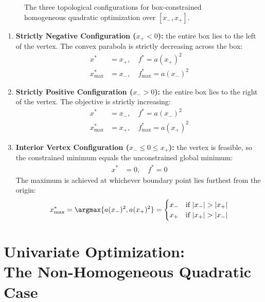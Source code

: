 \begin{figure}[H]
{\begin{tikzpicture}[>=Stealth, font=\small]
\end{tikzpicture}%
}
\caption{The three topological configurations for box-constrained homogeneous quadratic optimization over $[x_-, x_+]$.}
\label{fig:parabola-cases-box-en}
\end{figure}

\begin{enumerate}
    \item \textbf{Strictly Negative Configuration ($x_+ < 0$):} the entire box lies to the left of the vertex. The convex parabola is strictly decreasing across the box:
    \begin{align}
    x^* &= x_+, \quad f^* = a (x_+)^2 \\
    x^*_{\max} &= x_-, \quad f^*_{\max} = a (x_-)^2
    \end{align}
    \item \textbf{Strictly Positive Configuration ($x_- > 0$):} the entire box lies to the right of the vertex. The objective is strictly increasing:
    \begin{align}
    x^* &= x_-, \quad f^* = a (x_-)^2 \\
    x^*_{\max} &= x_+, \quad f^*_{\max} = a (x_+)^2
    \end{align}
    \item \textbf{Interior Vertex Configuration ($x_- \le 0 \le x_+$):} the vertex is feasible, so the constrained minimum equals the unconstrained global minimum:
    \begin{align}
    x^* &= 0, \quad f^* = 0
    \end{align}
    The maximum is achieved at whichever boundary point lies furthest from the origin:
    \begin{equation}
    x^*_{\max} = \argmax \{ a(x_-)^2, a(x_+)^2 \} = \begin{cases} x_- & \text{if } |x_-| > |x_+| \\ x_+ & \text{if } |x_+| > |x_-| \end{cases}
    \end{equation}
\end{enumerate}


\FloatBarrier
\section[Univariate Optimization: Non-Homogeneous Quadratic Case]{Univariate Optimization:\\ The Non-Homogeneous Quadratic Case}
\label{sec:opt-non-homogeneous-quadratic}

